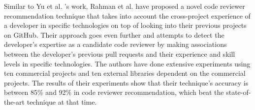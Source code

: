         Similar to Yu et al. \cite{yu2016reviewer}'s work, Rahman et al. \cite{rahman2016correct} have proposed a novel code reviewer recommendation technique that takes into account the cross-project experience of a developer in specific technologies on top of looking into their previous projects on GitHub. Their approach goes even further and attempts to detect the developer's expertise as a candidate code reviewer by making associations between the developer's previous pull requests and their experience and skill levels in specific technologies. The authors have done extensive experiments using ten commercial projects and ten external libraries dependent on the commercial projects. The results of their experiments show that their technique's accuracy is between 85\% and 92\% in code reviewer recommendation, which beat the state-of-the-art technique at that time.